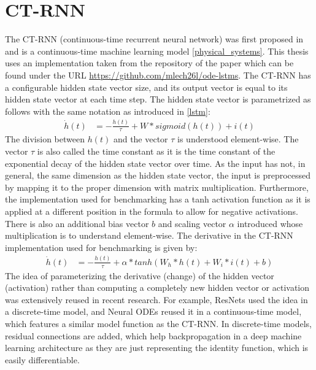\documentclass[draft,final]{vutinfth} %
\begin{document}
    \section{CT-RNN} \label{ctrnn}
    The CT-RNN (continuous-time recurrent neural network) was first proposed in \cite{CTRNN} and is a continuous-time machine learning model \ref{physical_systems}.
    This thesis uses an implementation taken from the repository of the paper \cite{ODELSTM} which can be found under the URL \url{https://github.com/mlech26l/ode-lstms}.
    The CT-RNN has a configurable hidden state vector size, and its output vector is equal to its hidden state vector at each time step.
    The hidden state vector is parametrized as follows \cite[p. 2]{CTRNN} with the same notation as introduced in \ref{lstm}:
    \begin{align}
    \label{paper_ct_rnn_function}
    \dot h(t) &= -\frac{h(t)}{\tau} + W * sigmoid(h(t)) + i(t)
    \end{align}
    The division between $h(t)$ and the vector $\tau$ is understood element-wise. The vector $\tau$ is also called the time constant as it is the time constant of the exponential decay of the hidden state vector over time.
    As the input has not, in general, the same dimension as the hidden state vector, the input is preprocessed by mapping it to the proper dimension with matrix multiplication.
    Furthermore, the implementation used for benchmarking has a tanh activation function as it is applied at a different position in the formula to allow for negative activations.
    There is also an additional bias vector $b$ and scaling vector $\alpha$ introduced whose multiplication is to understand element-wise.
    The derivative in the CT-RNN implementation used for benchmarking is given by:
    \begin{align}
    \label{used_ct_rnn_function}
    \dot h(t) &= -\frac{h(t)}{\tau} + \alpha * tanh(W_h * h(t) + W_i * i(t) + b)
    \end{align}
    The idea of parameterizing the derivative (change) of the hidden vector (activation) rather than computing a completely new hidden vector or activation was extensively reused in recent research.
    For example, ResNets \cite{ResNet} used the idea in a discrete-time model, and Neural ODEs \cite{NeuralODEs} reused it in a continuous-time model, which features a similar model function as the CT-RNN.
    In discrete-time models, residual connections are added, which help backpropagation in a deep machine learning architecture as they are just representing the identity function, which is easily differentiable.
\end{document}
